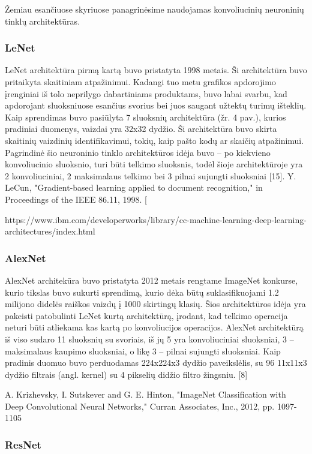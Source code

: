 \documentclass{VUMIFInfBakalaurinis}
\begin{document}
Žemiau esančiuose skyriuose panagrinėsime naudojamas konvoliucinių neuroninių tinklų architektūras.

\subsubsection{LeNet}

LeNet architektūra pirmą kartą buvo pristatyta 1998 metais. Ši architektūra buvo pritaikyta skaitiniam atpažinimui. Kadangi tuo metu grafikos apdorojimo įrenginiai iš tolo neprilygo dabartiniams produktams, buvo  labai svarbu, kad apdorojant sluoksniuose esančius svorius bei juos saugant  užtektų turimų išteklių. Kaip sprendimas buvo pasiūlyta 7 sluoksnių architektūra (žr. 4 pav.), kurios pradiniai duomenys, vaizdai  yra 32x32 dydžio. Ši architektūra buvo skirta skaitinių vaizdinių identifikavimui, tokių, kaip pašto kodų ar skaičių atpažinimui. Pagrindinė šio neuroninio tinklo architektūros idėja buvo – po kiekvieno konvoliucinio sluoksnio, turi būti telkimo sluoksnis, todėl šioje architektūroje yra 2 konvoliuciniai, 2 maksimalaus telkimo bei 3 pilnai sujungti sluoksniai [15].  Y. LeCun, "Gradient-based learning applied to document recognition," in Proceedings of the IEEE 86.11, 1998.  
[

https://www.ibm.com/developerworks/library/cc-machine-learning-deep-learning-architectures/index.html

\subsubsection{AlexNet}
AlexNet architekūra buvo pristatyta 2012 metais rengtame ImageNet konkurse, kurio tikslas buvo sukurti sprendimą, kurio dėka būtų suklasifikuojami 1.2 milijono didelės raiškos vaizdų į 1000 skirtingų klasių. Šios architektūros idėja yra pakeisti patobulinti LeNet kurtą architektūrą, įrodant, kad telkimo operacija neturi būti atliekama kas kartą po konvoliucijos operacijos. AlexNet architektūrą iš viso sudaro 11 sluoksnių su svoriais, iš jų 5 yra konvoliuciniai sluoksniai, 3 – maksimalaus kaupimo sluoksniai, o likę 3 – pilnai sujungti sluoksniai. Kaip pradinis duomuo buvo perduodamas 224x224x3 dydžio paveikslėlis, su 96 11x11x3 dydžio filtrais (angl. kernel) su 4 pikselių didžio filtro žingsniu. [8]  
 
 A. Krizhevsky, I. Sutskever and G. E. Hinton, "ImageNet Classification with Deep Convolutional Neural Networks," Curran Associates, Inc., 2012, pp. 1097-1105
 
\subsubsection{ResNet}
\end{document}
